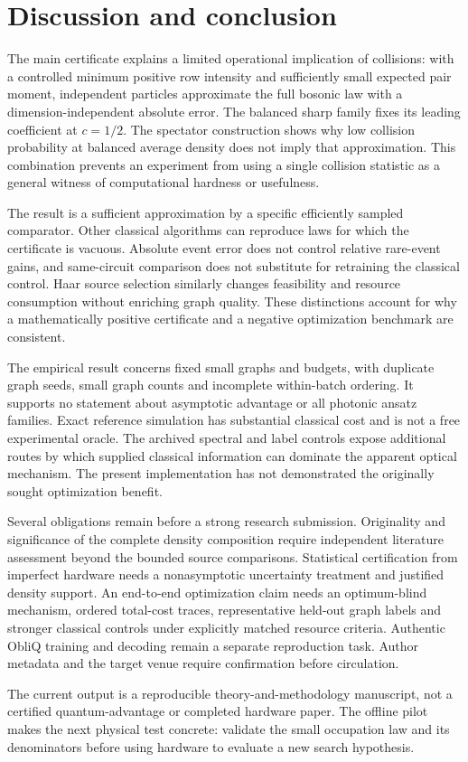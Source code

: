 \section{Discussion and conclusion}\label{sec:discussion}
The main certificate explains a limited operational implication of collisions: with a controlled minimum positive row intensity and sufficiently small expected pair moment, independent particles approximate the full bosonic law with a dimension-independent absolute error. The balanced sharp family fixes its leading coefficient at $c=1/2$. The spectator construction shows why low collision probability at balanced average density does not imply that approximation. This combination prevents an experiment from using a single collision statistic as a general witness of computational hardness or usefulness.

The result is a sufficient approximation by a specific efficiently sampled comparator. Other classical algorithms can reproduce laws for which the certificate is vacuous. Absolute event error does not control relative rare-event gains, and same-circuit comparison does not substitute for retraining the classical control. Haar source selection similarly changes feasibility and resource consumption without enriching graph quality. These distinctions account for why a mathematically positive certificate and a negative optimization benchmark are consistent.

The empirical result concerns fixed small graphs and budgets, with duplicate graph seeds, small graph counts and incomplete within-batch ordering. It supports no statement about asymptotic advantage or all photonic ansatz families. Exact reference simulation has substantial classical cost and is not a free experimental oracle. The archived spectral and label controls expose additional routes by which supplied classical information can dominate the apparent optical mechanism. The present implementation has not demonstrated the originally sought optimization benefit.

Several obligations remain before a strong research submission. Originality and significance of the complete density composition require independent literature assessment beyond the bounded source comparisons. Statistical certification from imperfect hardware needs a nonasymptotic uncertainty treatment and justified density support. An end-to-end optimization claim needs an optimum-blind mechanism, ordered total-cost traces, representative held-out graph labels and stronger classical controls under explicitly matched resource criteria. Authentic ObliQ training and decoding remain a separate reproduction task. Author metadata and the target venue require confirmation before circulation.

The current output is a reproducible theory-and-methodology manuscript, not a certified quantum-advantage or completed hardware paper. The offline pilot makes the next physical test concrete: validate the small occupation law and its denominators before using hardware to evaluate a new search hypothesis.
